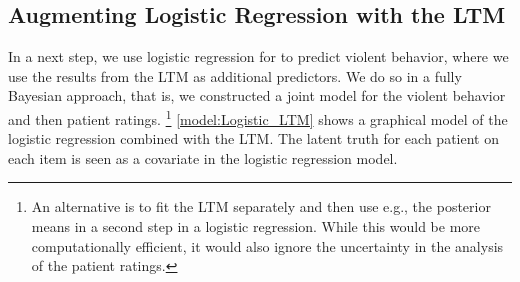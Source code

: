 \documentclass[a4paper,11pt]{article}
\begin{document}
\subsection{Augmenting Logistic Regression with the LTM}
In a next step, we use logistic regression for to predict violent behavior, where we use the results from the LTM as additional predictors.
We do so in a fully Bayesian approach, that is, we constructed a joint model for the violent behavior and then patient ratings.%
\footnote{%
An alternative is to fit the LTM separately and then use e.g., the posterior means in a second step in a logistic regression.
While this would be more computationally efficient, it would also ignore the uncertainty in the analysis of the patient ratings.
}
\autoref{model:Logistic_LTM} shows a graphical model of the logistic regression combined with the LTM.
The latent truth for each patient on each item is seen as a covariate in the logistic regression model.

\end{document}
